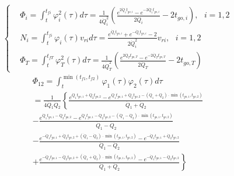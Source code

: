 \begin{equation}
\label{eq:34}
\left\{
\begin{aligned}
& {\Phi _i} = \int_t^{{t_{fi}}} {\varphi _i^2} (\tau )d\tau  = \frac{1}{{4\dot Q_i^2}}\left( {\frac{{{e^{2{{\dot Q}_i}{t_{go,i}}}} - {e^{ - 2{{\dot Q}_i}{t_{go,i}}}}}}{{2{{\dot Q}_i}}} - 2{t_{go,i}}} \right),{\text{ }}i = 1,2 \\
& {N_i} = \int_t^{{t_{fi}}} {{\varphi _i}} (\tau ){v_{ri}}d\tau  = \frac{{{e^{{{\dot Q}_i}{t_{go,i}}}} + {e^{ - {{\dot Q}_i}{t_{go,i}}}} - 2}}{{2\dot Q_i^2}}{v_{ri}},{\text{ }}i = 1,2 \\
& {\Phi _T} = \int_t^{{t_{fT}}} {\varphi _T^2} (\tau )d\tau  = \frac{1}{{4\dot Q_T^2}}\left( {\frac{{{e^{2{{\dot Q}_T}{t_{go,T}}}} - {e^{ - 2{{\dot Q}_T}{t_{go,T}}}}}}{{2{{\dot Q}_T}}} - 2{t_{go,T}}} \right)
\end{aligned}
\right.
\end{equation}
\begin{equation}
\label{eq:35}
\begin{gathered}
  {\Phi _{12}} = \int_t^{\min ({t_{f1}},{t_{f2}})} {{\varphi _1}(\tau ){\varphi _2}(\tau )} d\tau  \\ 
   = \frac{1}{{4{{\dot Q}_1}{{\dot Q}_2}}}\left\{ {\frac{{{e^{{{\dot Q}_1}{t_{go,1}} + {{\dot Q}_2}{t_{go,2}}}} - {e^{{{\dot Q}_1}{t_{go,1}} + {{\dot Q}_2}{t_{go,2}} - ({{\dot Q}_1} + {{\dot Q}_2}) \cdot \min ({t_{go,1}},{t_{go,2}})}}}}{{{{\dot Q}_1} + {{\dot Q}_2}}}} \right. \\ 
   - \frac{{{e^{{{\dot Q}_1}{t_{go,1}} - {{\dot Q}_2}{t_{go,2}}}} - {e^{{{\dot Q}_1}{t_{go,1}} - {{\dot Q}_2}{t_{go,2}} - ({{\dot Q}_1} - {{\dot Q}_2}) \cdot \min ({t_{go,1}},{t_{go,2}})}}}}{{{{\dot Q}_1} - {{\dot Q}_2}}} \\ 
   - \frac{{{e^{ - {{\dot Q}_1}{t_{go,1}} + {{\dot Q}_2}{t_{go,2}} + ({{\dot Q}_1} - {{\dot Q}_2}) \cdot \min ({t_{go,1}},{t_{go,2}})}} - {e^{ - {{\dot Q}_1}{t_{go,1}} + {{\dot Q}_2}{t_{go,2}}}}}}{{{{\dot Q}_1} - {{\dot Q}_2}}} \\ 
  \left. { + \frac{{{e^{ - {{\dot Q}_1}{t_{go,1}} - {{\dot Q}_2}{t_{go,2}} + ({{\dot Q}_1} + {{\dot Q}_2}) \cdot \min ({t_{go,1}},{t_{go,2}})}} - {e^{ - {{\dot Q}_1}{t_{go,1}} - {{\dot Q}_2}{t_{go,2}}}}}}{{{{\dot Q}_1} + {{\dot Q}_2}}}} \right\} \\ 
\end{gathered}
\end{equation}
